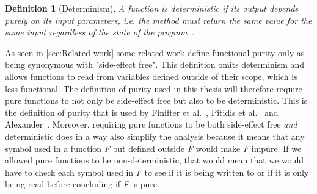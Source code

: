 \documentclass[a4paper,12pt]{article}
\newtheorem{definition}{Definition} %
\begin{document}
\begin{definition}[Determinism] \label{def:determinism}
  A function is deterministic if its output depends purely on its input parameters, i.e. the method must return the same value for the same input regardless of the state of the program~\cite{purity-in-java}.
\end{definition}

As seen in \autoref{sec:Related work} some related work define functional purity only as being synonymous with "side-effect free". This definition omits determinism and allows functions to read from variables defined outside of their scope, which is less functional. The definition of purity used in this thesis will therefore require pure functions to not only be side-effect free but also to be deterministic. This is the definition of purity that is used by Finifter et al.~\cite{purity-in-java}, Pitidis et al.~\cite{pitidis2010purity} and Alexander~\cite{alvin-alexander}. %
Moreover, requiring pure functions to be both side-effect free \textit{and} deterministic does in a way also simplify the analysis because it means that any symbol used in a function \textit{F} but defined outside \textit{F} would make \textit{F} impure. If we allowed pure functions to be non-deterministic, that would mean that we would have to check each symbol used in \textit{F} to see if it is being written to or if it is only being read before concluding if \textit{F} is pure.



\end{document}
